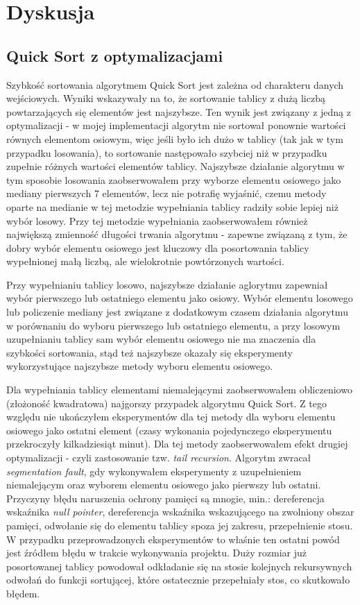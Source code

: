 \documentclass{article}
\begin{document}
\section{Dyskusja}
\subsection{Quick Sort z optymalizacjami}
Szybkość sortowania algorytmem Quick Sort jest zależna od charakteru danych wejściowych. Wyniki wskazywały na to, że sortowanie tablicy z dużą liczbą powtarzających się elementów jest najszybsze. Ten wynik jest związany z jedną z optymalizacji - w mojej implementacji algorytm nie sortował ponownie wartości równych elementom osiowym, więc jeśli było ich dużo w tablicy (tak jak w tym przypadku losowania), to sortowanie następowało szybciej niż w przypadku zupełnie różnych wartości elementów tablicy. Najszybsze działanie algorytmu w tym sposobie losowania zaobserwowałem przy wyborze elementu osiowego jako mediany pierwszych 7 elementów, lecz nie potrafię wyjaśnić, czemu metody oparte na medianie w tej metodzie wypełniania tablicy radziły sobie lepiej niż wybór losowy. Przy tej metodzie wypełniania zaobserwowałem również największą zmienność długości trwania algorytmu - zapewne związaną z tym, że dobry wybór elementu osiowego jest kluczowy dla posortowania tablicy wypełnionej małą liczbą, ale wielokrotnie powtórzonych wartości.

Przy wypełnianiu tablicy losowo, najszybsze działanie aglorytmu zapewniał wybór pierwszego lub ostatniego elementu jako osiowy. Wybór elementu losowego lub policzenie mediany jest związane z dodatkowym czasem działania algorytmu w porównaniu do wyboru pierwszego lub ostatniego elementu, a przy losowym uzupełnianiu tablicy sam wybór elementu osiowego nie ma znaczenia dla szybkości sortowania, stąd też najszybsze okazały się eksperymenty wykorzystujące najszybsze metody wyboru elementu osiowego.


Dla wypełniania tablicy elementami niemalejącymi zaobserwowałem obliczeniowo (złożoność kwadratowa) najgorszy przypadek algorytmu Quick Sort. Z tego względu nie ukończyłem eksperymentów dla tej metody dla wyboru elementu osiowego jako ostatni element (czasy wykonania pojedynczego eksperymentu przekroczyły kilkadziesiąt minut). Dla tej metody zaobserwowałem efekt drugiej optymalizacji - czyli zastosowanie tzw. \textit{tail recursion}. Algorytm zwracał \textit{segmentation fault}, gdy wykonywałem eksperymenty z uzupełnieniem niemalejącym oraz wyborem elementu osiowego jako pierwszy lub ostatni. Przyczyny błędu naruszenia ochrony pamięci są mnogie, min.: dereferencja wskaźnika \textit{null pointer}, dereferencja wskaźnika wskazującego na zwolniony obszar pamięci, odwołanie się do elementu tablicy spoza jej zakresu, przepełnienie stosu. W przypadku przeprowadzonych eksperymentów to właśnie ten ostatni powód jest źródłem błędu w trakcie wykonywania projektu. Duży rozmiar już posortowanej tablicy powodował odkładanie się na stosie kolejnych rekursywnych odwołań do funkcji sortującej, które ostatecznie przepełniały stos, co skutkowało błędem.
\end{document}
